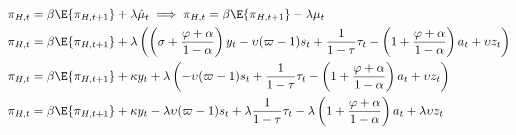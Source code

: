 

\begin{align}
    \pi_{H,t} &= \beta \E \{\pi_{H,t+1}\} + \lambda \hat{\mu}_t \implies \pi_{H,t} = \beta \E \{\pi_{H,t+1}\} - \lambda \mu_t \\
    \pi_{H,t} &= \beta \E \{\pi_{H,t+1}\} + \lambda \left(\left(\sigma + \frac{\varphi + \alpha}{1-\alpha}\right)y_t - \upsilon (\varpi - 1) s_t + \frac{1}{1-\tau}\tau_t  - \left(1 + \frac{\varphi + \alpha}{1-\alpha}\right)a_t + \upsilon z_t\right) \\
    \pi_{H,t} &= \beta \E \{\pi_{H,t+1}\} + \kappa y_t + \lambda \left(- \upsilon (\varpi - 1) s_t + \frac{1}{1-\tau}\tau_t  - \left(1 + \frac{\varphi + \alpha}{1-\alpha}\right)a_t + \upsilon z_t\right) \\
    \pi_{H,t} &= \beta \E \{\pi_{H,t+1}\} + \kappa y_t - \lambda \upsilon (\varpi - 1) s_t + \lambda\frac{1}{1-\tau}\tau_t  - \lambda\left(1 + \frac{\varphi + \alpha}{1-\alpha}\right)a_t + \lambda\upsilon z_t \\
\end{align}
\pagebreak
